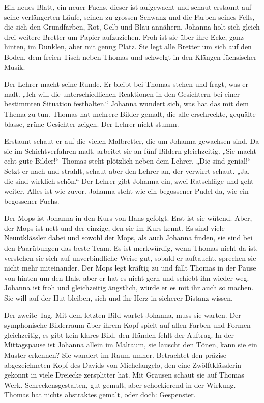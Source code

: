 \documentclass[10pt,titlepage,a5paper]{book}
\begin{document}
Ein neues Blatt, ein neuer Fuchs, dieser ist aufgewacht und schaut erstaunt auf seine verlängerten Läufe, seinen zu grossen Schwanz und die Farben seines Fells, die sich den Grundfarben, Rot, Gelb und Blau annähern. Johanna holt sich gleich drei weitere Bretter um Papier aufzuziehen. Froh ist sie über ihre Ecke, ganz hinten, im Dunklen, aber mit genug Platz. Sie legt alle Bretter um sich auf den Boden, dem freien Tisch neben Thomas und schwelgt in den Klängen füchsischer Musik.

Der Lehrer macht seine Runde. Er bleibt bei Thomas stehen und fragt, was er malt. „Ich will die unterschiedlichen Reaktionen in den Gesichtern bei einer bestimmten Situation festhalten.“ Johanna wundert sich, was hat das mit dem Thema zu tun. Thomas hat mehrere Bilder gemalt, die alle erschreckte, gequälte blasse, grüne Gesichter zeigen. Der Lehrer nickt stumm. 

Erstaunt schaut er auf die vielen Malbretter, die um Johanna gewachsen sind. Da sie im Schichtverfahren malt, arbeitet sie an fünf Bildern gleichzeitig. „Sie macht echt gute Bilder!“ Thomas steht plötzlich neben dem Lehrer. „Die sind genial!“ Setzt er nach und strahlt, schaut aber den Lehrer an, der verwirrt schaut. „Ja, die sind wirklich schön.“ Der Lehrer gibt Johanna ein, zwei Ratschläge und geht weiter. Alles ist wie zuvor. Johanna steht wie ein begossener Pudel da, wie ein begossener Fuchs.

Der Mops ist Johanna in den Kurs von Hans gefolgt. Erst ist sie wütend.  Aber, der Mops ist nett und der einzige, den sie im Kurs kennt. Es sind viele Neuntklässler dabei und sowohl der Mops, als auch Johanna finden, sie sind bei den Paarübungen das beste Team. Es ist merkwürdig, wenn Thomas nicht da ist, verstehen sie sich auf unverbindliche Weise gut, sobald er auftaucht, sprechen sie nicht mehr miteinander. Der Mops legt kräftig zu und fällt Thomas in der Pause von hinten um den Hals, aber er hat es nicht gern und schiebt ihn wieder weg. Johanna ist froh und gleichzeitig ängstlich, würde er es mit ihr auch so machen. Sie will auf der Hut bleiben, sich und ihr Herz in sicherer Distanz wissen.

Der zweite Tag. Mit dem letzten Bild wartet Johanna, muss sie warten. Der symphonische Bilderraum über ihrem Kopf spielt auf allen Farben und Formen gleichzeitig, es gibt kein klares Bild, den Händen fehlt der Auftrag. In der Mittagspause ist Johanna allein im Malraum, sie lauscht den Tönen, kann sie ein Muster erkennen? Sie wandert im Raum umher. Betrachtet den präzise abgezeichneten Kopf des Davids von Michelangelo, den eine Zwölftklässlerin gekonnt in viele Dreiecke zersplitter hat. Mit Grausen schaut sie auf Thomas Werk. Schreckensgestalten, gut gemalt, aber schockierend in der Wirkung. Thomas hat nichts abstraktes gemalt, oder doch: Gespenster.
\end{document}
